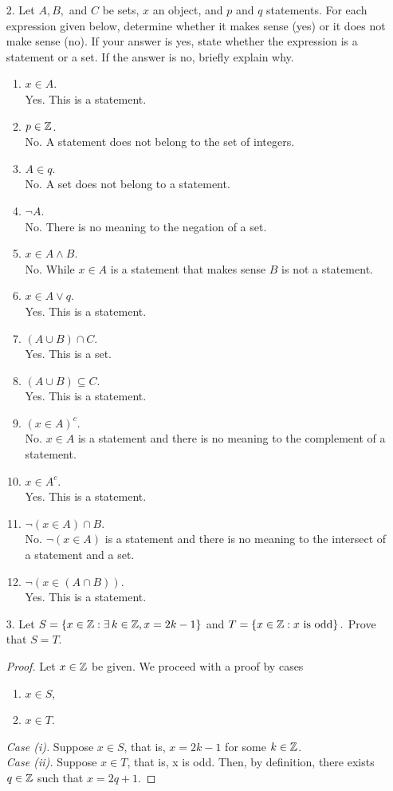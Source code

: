 \documentclass[a4paper, 12pt]{../../config/homework}
\begin{document}
\begin{enumerate}
\item[2.] Let $A,B,$ and $C$ be sets, $x$ an object, and $p$ and $q$ statements. For each expression given below, determine whether it makes sense (yes) or it does not make sense (no). If your answer is yes, state whether the expression is a statement or a set. If the answer is no, briefly explain why.
\begin{enumerate}[label=\alph*)]
\item $x\in A$.
\\Yes. This is a statement.
\item $p\in\mathbb{Z}$.
\\No. A statement does not belong to the set of integers.
\item $A\in q$.
\\No. A set does not belong to a statement.
\item $\neg A$.
\\No. There is no meaning to the negation of a set.
\item $x\in A \land B$.
\\No. While $x\in A$ is a statement that makes sense $B$ is not a statement.
\item $x\in A \lor q$.
\\Yes. This is a statement.
\item $(A \cup B) \cap C$.
\\Yes. This is a set.
\item $(A\cup B) \subseteq C$.
\\Yes. This is a statement.
\item $(x\in A)^c$.
\\No. $x\in A$ is a statement and there is no meaning to the complement of a statement.
\item $x\in A^c$.
\\Yes. This is a statement.
\item $\neg (x\in A) \cap B$.
\\No. $\neg (x\in A)$ is a statement and there is no meaning to the intersect of a statement and a set.
\item $\neg (x \in (A \cap B))$.
\\Yes. This is a statement.
\end{enumerate}

\pagebreak
\item[3.] Let $S = \left\{x\in\mathbb{Z}:\exists\,k\in\mathbb{Z}, x=2k-1\right\}$ and $T=\left\{x\in\mathbb{Z}:x\ \text{is odd}\right\}.$ Prove that $S=T$.
\begin{proof}
Let $x\in\mathbb{Z}$ be given. We proceed with a proof by cases
\begin{enumerate}[label=(\roman*).]
\item $x\in S$,
\item $x\in T$.
\end{enumerate}
\textit{Case (i).} Suppose $x\in S$, that is, $x=2k-1$ for some $k\in\mathbb{Z}$.
\\\textit{Case (ii).} Suppose $x\in T$, that is, x is odd. Then, by definition, there exists $q\in\mathbb{Z}$ such that $x=2q + 1$.
\end{proof}


\end{enumerate}
\end{document}
